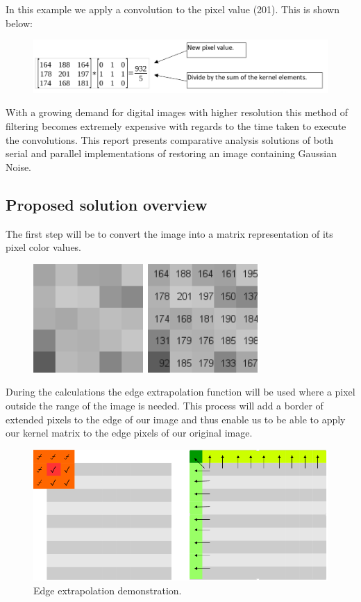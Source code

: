 \documentclass[paper=a4, fontsize=11pt]{scrartcl} %
\numberwithin{equation}{section} %
\numberwithin{figure}{section} %
\numberwithin{table}{section} %
\begin{document}
In this example we apply a convolution to the pixel value (201).
This is shown below:

\begin{figure}[H]
	\centering
	\includegraphics[scale=0.3]{"kernel example"}
        \label{kernel}
\end{figure}

With a growing demand for digital images with higher resolution this method of filtering becomes extremely expensive with regards to the time taken to execute the convolutions. This report presents comparative analysis solutions of both serial and parallel implementations of restoring an image containing Gaussian Noise.

\subsection{Proposed solution overview}
The first step will be to convert the image into a matrix representation of its pixel color values.

\begin{figure}[H]
	\centering
	\includegraphics[scale=0.5]{"greyscale2"}
        \label{greyscale2}
\end{figure}

During the calculations the edge extrapolation function will be used where a pixel outside the range of the image is needed. This process will add a border of extended pixels to the edge of our image and thus enable us to be able to apply our kernel matrix to the edge pixels of our original image.

\begin{figure}[H]
	\centering
	\includegraphics[scale=0.5]{"edge extrapolation"}
        \caption{Edge extrapolation demonstration.}
        \label{edge}
\end{figure}
\end{document}
